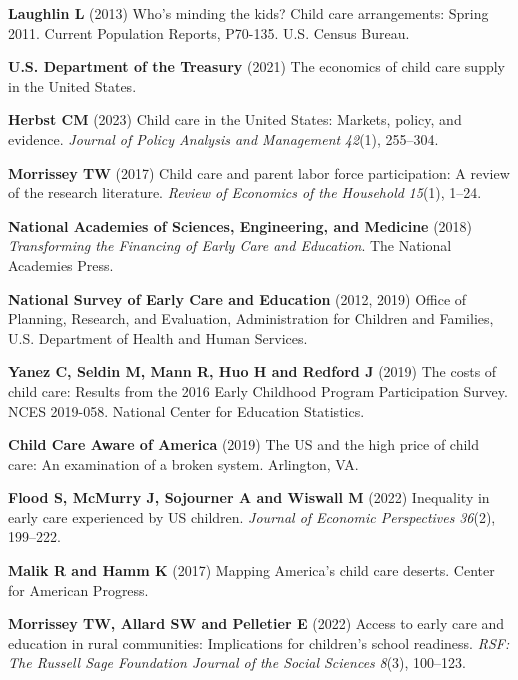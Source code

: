\documentclass{CUP-JNL-DAP}%
\begin{document}
\begin{Backmatter}
\begin{thebibliography}{}

\textbf{Laughlin L} (2013) Who's minding the kids? Child care arrangements: Spring 2011. Current Population Reports, P70-135. U.S. Census Bureau.

\textbf{U.S. Department of the Treasury} (2021) The economics of child care supply in the United States.

\textbf{Herbst CM} (2023) Child care in the United States: Markets, policy, and evidence. \textit{Journal of Policy Analysis and Management} \textit{42}(1), 255--304.

\textbf{Morrissey TW} (2017) Child care and parent labor force participation: A review of the research literature. \textit{Review of Economics of the Household} \textit{15}(1), 1--24.

\textbf{National Academies of Sciences, Engineering, and Medicine} (2018) \textit{Transforming the Financing of Early Care and Education}. The National Academies Press.

\textbf{National Survey of Early Care and Education} (2012, 2019) Office of Planning, Research, and Evaluation, Administration for Children and Families, U.S. Department of Health and Human Services.

\textbf{Yanez C, Seldin M, Mann R, Huo H and Redford J} (2019) The costs of child care: Results from the 2016 Early Childhood Program Participation Survey. NCES 2019-058. National Center for Education Statistics.

\textbf{Child Care Aware of America} (2019) The US and the high price of child care: An examination of a broken system. Arlington, VA.

\textbf{Flood S, McMurry J, Sojourner A and Wiswall M} (2022) Inequality in early care experienced by US children. \textit{Journal of Economic Perspectives} \textit{36}(2), 199--222.

\textbf{Malik R and Hamm K} (2017) Mapping America's child care deserts. Center for American Progress.

\textbf{Morrissey TW, Allard SW and Pelletier E} (2022) Access to early care and education in rural communities: Implications for children's school readiness. \textit{RSF: The Russell Sage Foundation Journal of the Social Sciences} \textit{8}(3), 100--123.


\end{thebibliography}
\end{Backmatter}
\end{document}
